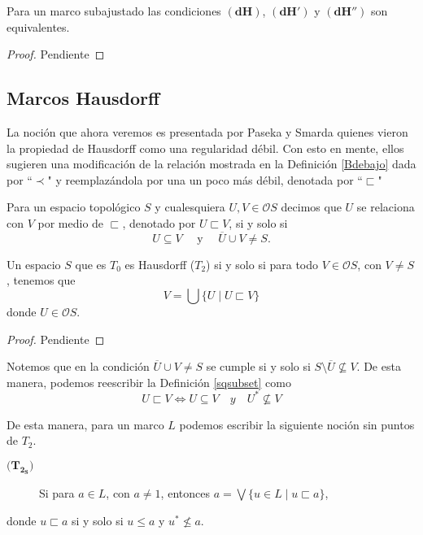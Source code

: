 \begin{prop}\label{Proposicion2.3.1}
    Para un marco subajustado las condiciones $\mathbf{(dH)}$, $\mathbf{(dH')}$ y $\mathbf{(dH'')}$ son equivalentes.
\end{prop}

\begin{proof}
    Pendiente
\end{proof}

\subsection{Marcos Hausdorff}

La noción que ahora veremos es presentada por Paseka y Smarda quienes vieron la propiedad de Hausdorff como una regularidad débil. Con esto en mente, ellos sugieren una modificación de la relación mostrada en la Definición \ref{Bdebajo} dada por ``$\prec$" y reemplazándola por una un poco más débil, denotada por ``$\sqsubset$" 

\begin{dfn}\label{sqsubset}
    Para un espacio topológico $S$ y cualesquiera $U, V\in \mathcal{O}S$ decimos que $U$ se relaciona con $V$ por medio de $\sqsubset$, denotado por $U\sqsubset V$, si y solo si 
    \[
    U\subseteq V\quad\mbox{ y }\quad \overline{U}\cup V\neq S.
    \]
\end{dfn}

\begin{prop}\label{Proposicion3.2}
    Un espacio $S$ que es $T_0$ es Hausdorff ($T_2$) si y solo si para todo $V\in \mathcal{O}S$, con $V\neq S$, tenemos que 
    \[
    V=\bigcup\{U\mid U\sqsubset V\}
    \]
    donde $U\in \mathcal{O}S$.
\end{prop}

\begin{proof}
    Pendiente
\end{proof}

Notemos que en la condición $\overline{U}\cup V\neq S$ se cumple si y solo si $S\setminus \overline{U}\nsubseteq V$. De esta manera, podemos reescribir la Definición \ref{sqsubset} como 
\[
U\sqsubset V\Leftrightarrow U\subseteq V\quad{ y }\quad U^*\nsubseteq V
\]

De esta manera, para un marco $L$ podemos escribir la siguiente noción sin puntos de $T_2$.
\begin{description}
    \item[$\mathbf{(T_{2_S}})$] Si para $a\in L$, con $a\neq 1$, entonces $a=\bigvee\{u\in L\mid u\sqsubset a\}$, 
\end{description}
donde $u\sqsubset a$ si y solo si $u\leq a$ y $u^*\nleq a$.\\

